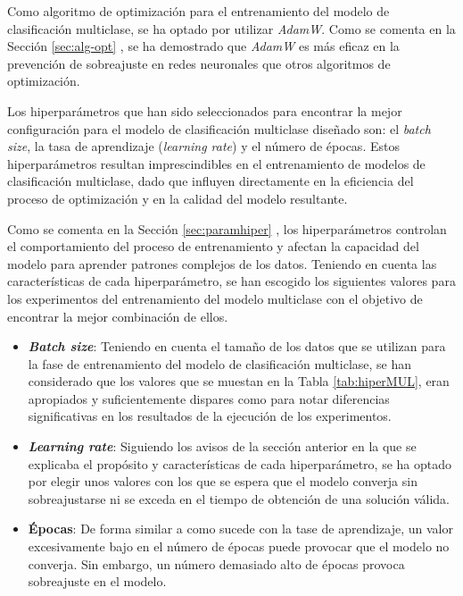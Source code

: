 Como algoritmo de optimización para el entrenamiento del modelo de clasificación multiclase, se ha optado por utilizar \textit{AdamW}. Como se comenta en la Sección \ref{sec:alg-opt} , se ha demostrado que \textit{AdamW} es más eficaz en la prevención de sobreajuste en redes neuronales que otros algoritmos de optimización.

Los hiperparámetros que han sido seleccionados para encontrar la mejor configuración para el modelo de clasificación multiclase diseñado son: el \textit{batch size}, la tasa de aprendizaje (\textit{learning rate}) y el número de épocas. Estos hiperparámetros resultan imprescindibles en el entrenamiento de modelos de clasificación multiclase, dado que influyen directamente en la eficiencia del proceso de optimización y en la calidad del modelo resultante.

Como se comenta en la Sección \ref{sec:paramhiper} , los hiperparámetros controlan el comportamiento del proceso de entrenamiento y afectan la capacidad del modelo para aprender patrones complejos de los datos. Teniendo en cuenta las características de cada hiperparámetro, se han escogido los siguientes valores para los experimentos del entrenamiento del modelo multiclase con el objetivo de encontrar la mejor combinación de ellos.

\begin{itemize}
	\item \textbf{\textit{Batch size}}: Teniendo en cuenta el tamaño de los datos que se utilizan para la fase de entrenamiento del modelo de clasificación multiclase, se han considerado que los valores que se muestan en la Tabla \ref{tab:hiperMUL}, eran apropiados y suficientemente dispares como para notar diferencias significativas en los resultados de la ejecución de los experimentos.
	\item \textbf{\textit{Learning rate}}: Siguiendo los avisos de la sección anterior en la que se explicaba el propósito y características de cada hiperparámetro, se ha optado por elegir unos valores con los que se espera que el modelo converja sin sobreajustarse ni se exceda en el tiempo de obtención de una solución válida.
	\item \textbf{Épocas}: De forma similar a como sucede con la tase de aprendizaje, un valor excesivamente bajo en el número de épocas puede provocar que el modelo no converja. Sin embargo, un número demasiado alto de épocas provoca sobreajuste en el modelo.
\end{itemize}

